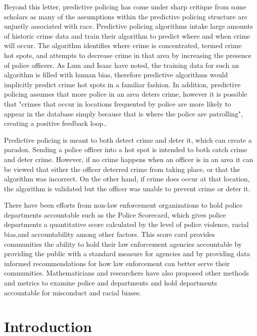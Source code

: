 \documentclass{article}
\begin{document}
Beyond this letter, predictive policing has come under sharp critique from some scholars as many of the assumptions within the predictive policing structure are unjustly associated with race.\cite{dirty-data}\cite{examining-predictive-policing} Predictive policing algorithms intake large amounts of historic crime data and train their algorithm to predict where and when crime will occur. The algorithm identifies where crime is concentrated, termed crime hot spots, and attempts to decrease crime in that area by increasing the presence of police officers. As Lum and Isaac have noted, the training data for such an algorithm is filled with human bias, therefore predictive algorithms would implicitly predict crime hot spots in a familiar fashion. In addition, predictive policing assumes that more police in an area deters crime, however it is possible that "crimes that occur in locations frequented by police are more likely to appear in the database simply because that is where the police are patrolling", creating a positive feedback loop.\cite{predict-serve}. 

Predictive policing is meant to both detect crime and deter it, which can create a paradox. Sending a police officer into a hot spot is intended to both catch crime and deter crime. However, if no crime happens when an officer is in an area it can be viewed that either the officer deterred crime from taking place, or that the algorithm was incorrect. On the other hand, if crime does occur at that location, the algorithm is validated but the officer was unable to prevent crime or deter it.  \cite{predictive-reform}

There have been efforts from non-law enforcement organizations to hold police departments accountable such as the Police Scorecard, which gives police departments a quantitative score calculated by the level of police violence, racial bias,and accountability among other factors. This score card provides communities the ability to hold their law enforcement agencies accountable by providing the public with a standard measure for agencies and by providing data informed recommendations for how law enforcement can better serve their communities. \cite{police-scorecard}
Mathematicians and researchers have also proposed other methods and metrics to examine police and departments and hold departments accountable for misconduct and racial biases.\cite{police-encounters}\cite{target-disruption}
 



\section{Introduction}
\end{document}
